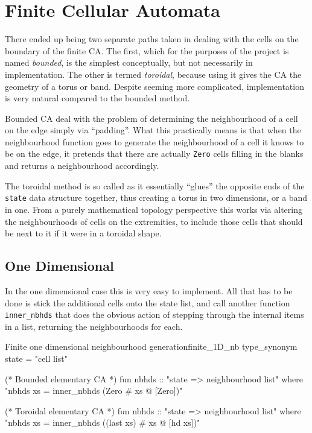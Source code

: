 \section{Finite Cellular Automata} \label{sec:finite_CA}

There ended up being two separate paths taken in dealing with the cells on the boundary of the finite CA.
The first,
which for the purposes of the project is named \emph{bounded},
is the simplest conceptually,
but not necessarily in implementation.
The other is termed \emph{toroidal},
because using it gives the CA the geometry of a torus or band.
Despite seeming more complicated,
implementation is very natural compared to the bounded method.

Bounded CA deal with the problem of determining the neighbourhood of a cell on the edge simply via ``padding''.
What this practically means is that when the neighbourhood function goes to generate the neighbourhood of a cell it knows to be on the edge,
it pretends that there are actually \texttt{Zero} cells filling in the blanks and returns a neighbourhood accordingly.

The toroidal method is so called as it essentially ``glues'' the opposite ends of the \texttt{state} data structure together,
thus creating a torus in two dimensions,
or a band in one.
From a purely mathematical topology perspective this works via altering the neighbourhoods of cells on the extremities,
to include those cells that should be next to it if it were in a toroidal shape.


\subsection{One Dimensional} 

In the one dimensional case this is very easy to implement.
All that has to be done is stick the additional cells onto the state list,
and call another function \texttt{inner_nbhds} that does the obvious action of stepping through the internal items in a list,
returning the neighbourhoods for each.

\begin{myminted}{Finite one dimensional neighbourhood generation}{finite_1D_nb}
    type_synonym state = "cell list"

    (* Bounded elementary CA *)
    fun nbhds :: "state => neighbourhood list" where
    "nbhds  xs = inner_nbhds (Zero # xs @ [Zero])"

    (* Toroidal elementary CA *)
    fun nbhds :: "state => neighbourhood list" where
    "nbhds xs = inner_nbhds ((last xs) # xs @ [hd xs])"
\end{myminted}

